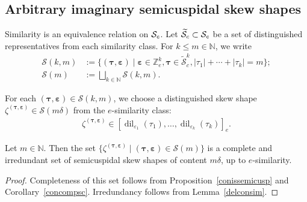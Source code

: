 \documentclass[Unicode,ALCO]{cedram}
\newcommand{\infl}{\operatorname{dil}}
\newcommand{\Z}{\mathbb{Z}}
\newcommand{\SSSS}{\mathcal{S}}
\newcommand{\SSSSS}{\boldsymbol{\mathcal{S}}}
\newcommand{\0}{{\bar 0}}
\newcommand{\NN}{{\mathbb N}}
\newcommand{\btau}{\boldsymbol{\tau}}
\newcommand{\bbep}{\boldsymbol{\varepsilon}}
\begin{document}
\subsection{Arbitrary imaginary semicuspidal skew shapes}
Similarity is an equivalence relation on \(\SSSS_{\tt c}\). Let \(\widetilde{\SSSS}_c \subset \SSSS_{\tt c}\) be a set of distinguished representatives from each similarity class. For \(k \leq m \in \NN\), we write
\begin{align*}
\SSSSS(k,m)&:= \{ (\btau, \bbep) \mid \bbep \in \Z_e^k, \btau \in \widetilde{\SSSS}_c^k, |\tau_1| + \cdots + |\tau_k| = m\};\\
\SSSSS(m)&:= \bigsqcup_{k \in \NN} \SSSSS(k,m).
\end{align*}

For each \((\btau, \bbep) \in \SSSSS(k,m)\), we choose a distinguished skew shape \(\zeta^{(\btau, \bbep)} \in \SSSS(m\delta)\) from the \(e\)-similarity class:
\begin{align*}
\zeta^{(\btau, \bbep)} \in [ \infl_{\varepsilon_1}(\tau_1), \ldots, \infl_{\varepsilon_k}(\tau_k)]_e.
\end{align*}
 
\begin{lemma}\label{arbdelsemi}
Let \(m \in \NN\). Then the set \(\{ \zeta^{(\btau, \bbep)} \mid (\btau, \bbep) \in \SSSSS(m)\}\) is a complete and irredundant set of semicuspidal skew shapes of content \(m \delta\), up to \(e\)-similarity.
\end{lemma}
\begin{proof}
Completeness of this set follows from Proposition~\ref{conissemicusp} and Corollary~\ref{concompsc}. Irredundancy follows from
Lemma~\ref{delconsim}.
\end{proof}
\end{document}
